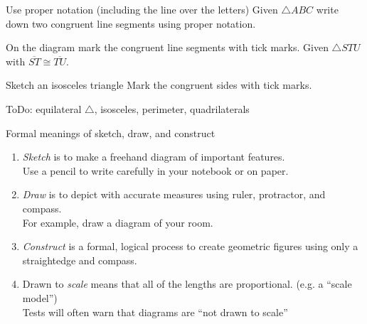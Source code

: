 \begin{frame}{Use proper notation (including the line over the letters)}
      Given $\triangle ABC$ write down two congruent line segments using proper notation.\\
      \end{frame}

\begin{frame}{On the diagram mark the congruent line segments with tick marks.}
      Given $\triangle STU$ with $\overline{ST} \cong \overline{TU}$. 
      \begin{center}
      \end{center}
    \end{frame}

\begin{frame}{ Sketch an isosceles triangle}
  Mark the congruent sides with tick marks.\par \vspace{4cm}
  ToDo: equilateral $\triangle$, isosceles, perimeter, quadrilaterals
\end{frame}

\begin{frame}{Formal meanings of sketch, draw, and construct}
  \begin{enumerate}
    \item \emph{Sketch} is to make a freehand diagram of important features. \\[0.15cm]
    Use a pencil to write carefully in your notebook or on paper.  \smallskip
    \item \emph{Draw}  is to depict with accurate measures using ruler, protractor, and compass.\\[0.15cm]
    For example, draw a diagram of your room. \smallskip
    \item \emph{Construct} is a formal, logical process to create geometric figures using only a straightedge and compass. \smallskip
    \item Drawn to \emph{scale} means that all of the lengths are proportional. (e.g. a ``scale model'')\\[0.15cm]
    Tests will often warn that diagrams are ``not drawn to scale''
  \end{enumerate}
\end{frame}

